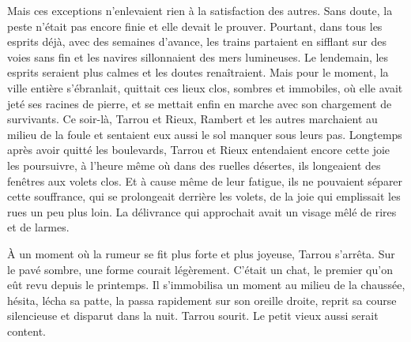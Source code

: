 \documentclass[french,twoside]{book} %
\begin{document}
Mais ces exceptions n’enlevaient rien à la satisfaction des autres. Sans doute, la peste n’était pas encore finie et elle devait le prouver. Pourtant, dans tous les esprits déjà, avec des semaines d’avance, les trains partaient en sifflant sur des voies sans fin et les navires sillonnaient des mers lumineuses. Le lendemain, les esprits seraient plus calmes et les doutes renaîtraient. Mais pour le moment, la ville entière s’ébranlait, quittait ces lieux clos, sombres et immobiles, où elle avait jeté ses racines de pierre, et se mettait enfin en marche avec son chargement de survivants. Ce soir-là, Tarrou et Rieux, Rambert et les autres marchaient au milieu de la foule et sentaient eux aussi le sol manquer sous leurs pas. Longtemps après avoir quitté les boulevards, Tarrou et Rieux entendaient encore cette joie les poursuivre, à l’heure même où dans des ruelles désertes, ils longeaient des fenêtres aux volets clos. Et à cause même de leur fatigue, ils ne pouvaient séparer cette souffrance, qui se prolongeait derrière les volets, de la joie qui emplissait les rues un peu plus loin. La délivrance qui approchait avait un visage mêlé de rires et de larmes.\par
À un moment où la rumeur se fit plus forte et plus joyeuse, Tarrou s’arrêta. Sur le pavé sombre, une forme courait légèrement. C’était un chat, le premier qu’on eût revu depuis le printemps. Il s’immobilisa un moment au milieu de la chaussée, hésita, lécha sa patte, la passa rapidement sur son oreille droite, reprit sa course silencieuse et disparut dans la nuit. Tarrou sourit. Le petit vieux aussi serait content.
\end{document}
